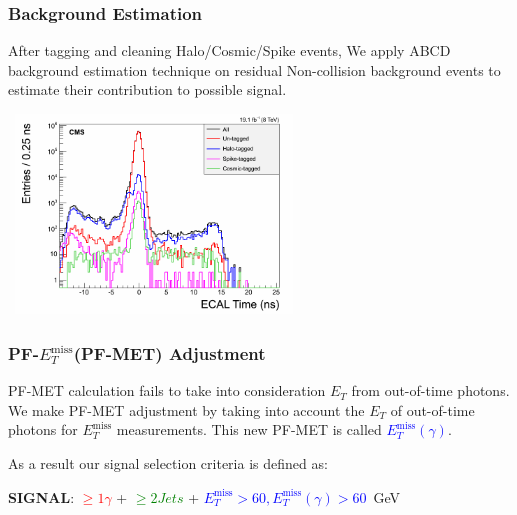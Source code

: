 \documentclass{beamer}
\begin{document}
\begin{frame}
\frametitle{\Huge{Background Estimation}}
\small{
After tagging and cleaning Halo/Cosmic/Spike events, We apply \alert{ABCD} background estimation technique on residual Non-collision background events to estimate their contribution to possible signal.}
\begin{tcolorbox}[colback=UNL@Cream!5,colframe=UMN@Maroon!40,title=\textcolor{black}{\textbf{Event Tagging and Cleaning Performance}}]

\mbox{
 \includegraphics[height=5.30cm,width=0.7\paperwidth]{THESISPLOTS/TimeForAll.png}
 } 
 \end{tcolorbox}
\end{frame}

\begin{frame}
\frametitle{PF-$E^{\mbox{miss}}_{T}$(PF-MET) Adjustment}

\begin{tcolorbox}[colback=UNL@Cream!5,colframe=UMN@Maroon!40,title=\textcolor{black}{$E^{\mbox{miss}}_{T}(\gamma)$}]
PF-MET calculation fails to take into consideration $E_{T}$ from out-of-time photons.
We make PF-MET adjustment by taking into account the $E_{T}$ of out-of-time photons for $E^{\mbox{miss}}_{T}$ measurements. This new  PF-MET is called \textcolor{blue}{$E^{\mbox{miss}}_{T}( \gamma)$}.
\end{tcolorbox}
As a result our signal selection criteria is defined as:

\begin{tcolorbox}[colback=UNL@Cream!5,colframe=UMN@Maroon!40,title=\textcolor{black}{\textcolor{green}{\textbf{Signal Selection Criteria}}}]
\textcolor{UMN@Maroon}{\textbf{SIGNAL}}: \textcolor{red}{$\geq 1 \gamma$}  + \textcolor{green}{$\geq 2 Jets$} + \textcolor{blue}{$E^{\mbox{miss}}_{T} > 60, E^{\mbox{miss}}_{T}(\gamma) > 60$}~GeV
\end{tcolorbox}
\end{frame}
\end{document}
